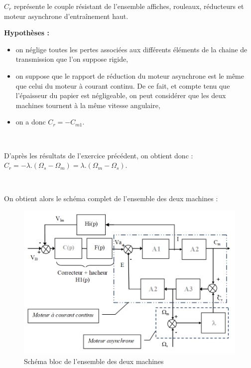 \newpage

$C_r$ représente le couple résistant de l'ensemble affiches, rouleaux, réducteurs et moteur asynchrone d'entraînement haut.

\textbf{Hypothèses :}
\begin{itemize}
 \item 	on néglige toutes les pertes associées aux différents éléments de la chaine de transmission que l'on suppose rigide,
 \item on suppose que le rapport de réduction du moteur asynchrone est le même que celui du moteur à courant continu. De ce fait, et compte tenu que l'épaisseur du papier est négligeable, on peut considérer que les deux machines tournent à la même vitesse angulaire,
 \item on a donc $C_r=-C_{m1}$.
\end{itemize} 

~\

D'après les résultats de l'exercice précédent, on obtient donc :\\
$C_r=-\lambda.(\Omega_s-\Omega_m)=\lambda.(\Omega_m-\Omega_s)$.

~\

On obtient alors le schéma complet de l'ensemble des deux machines :

\begin{figure}[!h]
\begin{center}
	\includegraphics[width=0.6\linewidth]{img/fig16}
\end{center}
	\caption{Schéma bloc de l'ensemble des deux machines}
	\label{fig16}
\end{figure}



